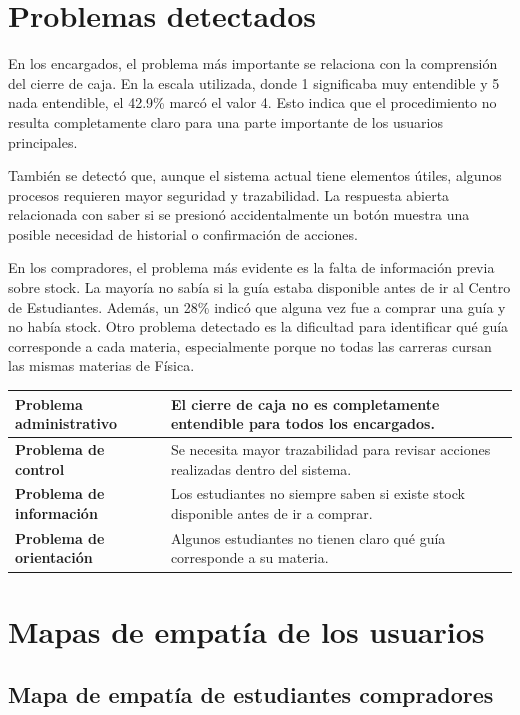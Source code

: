 \documentclass[12pt,letterpaper]{article}
\begin{document}
\section{Problemas detectados}

En los encargados, el problema más importante se relaciona con la comprensión del cierre de caja. En la escala utilizada, donde 1 significaba muy entendible y 5 nada entendible, el 42.9\% marcó el valor 4. Esto indica que el procedimiento no resulta completamente claro para una parte importante de los usuarios principales.

También se detectó que, aunque el sistema actual tiene elementos útiles, algunos procesos requieren mayor seguridad y trazabilidad. La respuesta abierta relacionada con saber si se presionó accidentalmente un botón muestra una posible necesidad de historial o confirmación de acciones.

En los compradores, el problema más evidente es la falta de información previa sobre stock. La mayoría no sabía si la guía estaba disponible antes de ir al Centro de Estudiantes. Además, un 28\% indicó que alguna vez fue a comprar una guía y no había stock. Otro problema detectado es la dificultad para identificar qué guía corresponde a cada materia, especialmente porque no todas las carreras cursan las mismas materias de Física.

\begin{center}
\begin{tabularx}{\textwidth}{|>{\bfseries}p{5cm}|X|}
\hline
Problema administrativo & El cierre de caja no es completamente entendible para todos los encargados. \\
\hline
Problema de control & Se necesita mayor trazabilidad para revisar acciones realizadas dentro del sistema. \\
\hline
Problema de información & Los estudiantes no siempre saben si existe stock disponible antes de ir a comprar. \\
\hline
Problema de orientación & Algunos estudiantes no tienen claro qué guía corresponde a su materia. \\
\hline
\end{tabularx}
\end{center}

\section{Mapas de empatía de los usuarios}

\subsection{Mapa de empatía de estudiantes compradores}
\end{document}
